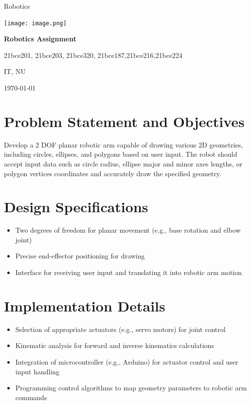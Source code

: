 \documentclass{article}
\newcommand{\thetitle}{Robotics Assignment}
\newcommand{\thecoursename}{Robotics}
\newcommand{\therollnumbers}{21bce201, 21bce203, 21bce320, 21bce187,21bce216,21bce224}
\begin{document}
\begin{titlepage}
    \centering
    \vspace*{2cm}
    {\LARGE \thecoursename \par}
    \vspace{1.5cm}
    \texttt{[image: image.png]} %
    \par\vspace{1cm}
    {\huge\bfseries \thetitle \par}
    \vspace{1cm}
    {\Large \therollnumbers \par}
    \vfill
    {\large \textsc{IT, NU}\par}
    \vspace{0.5cm}
    {\large \today\par}
\end{titlepage}

\tableofcontents
\newpage

\section{Problem Statement and Objectives}
Develop a 2 DOF planar robotic arm capable of drawing various 2D geometries, including circles, ellipses, and polygons based on user input. The robot should accept input data such as circle radius, ellipse major and minor axes lengths, or polygon vertices coordinates and accurately draw the specified geometry.

\section{Design Specifications}
\begin{itemize}
    \item Two degrees of freedom for planar movement (e.g., base rotation and elbow joint)
    \item Precise end-effector positioning for drawing
    \item Interface for receiving user input and translating it into robotic arm motion
\end{itemize}

\section{Implementation Details}
\begin{itemize}
    \item Selection of appropriate actuators (e.g., servo motors) for joint control
    \item Kinematic analysis for forward and inverse kinematics calculations
    \item Integration of microcontroller (e.g., Arduino) for actuator control and user input handling
    \item Programming control algorithms to map geometry parameters to robotic arm commands
\end{itemize}
\end{document}
